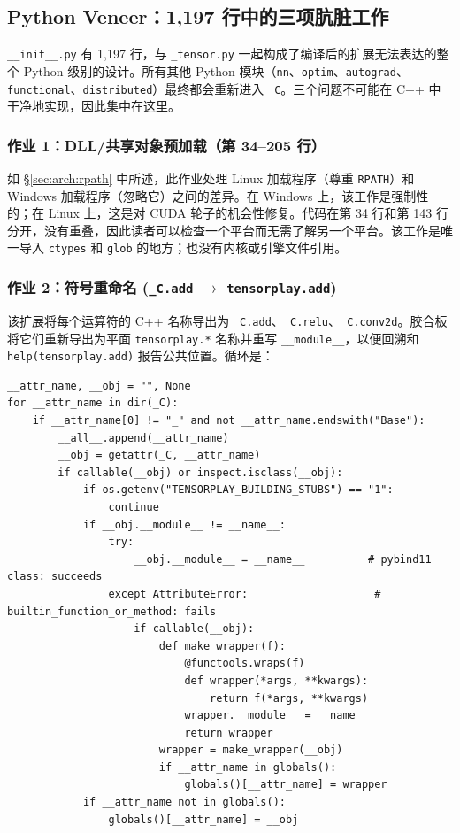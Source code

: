 \subsection{Python Veneer：1,197 行中的三项肮脏工作}
\label{sec:veneer}

\texttt{\_\_init\_\_.py} 有 1,197 行，与 \texttt{\_tensor.py} 一起构成了编译后的扩展无法表达的整个 Python 级别的设计。所有其他 Python 模块（\texttt{nn}、\texttt{optim}、\texttt{autograd}、\texttt{functional}、\texttt{distributed}）最终都会重新进入 \texttt{\_C}。三个问题不可能在 C++ 中干净地实现，因此集中在这里。

\subsubsection{作业 1：DLL/共享对象预加载（第 34--205 行）}
如 \S\ref{sec:arch:rpath} 中所述，此作业处理 Linux 加载程序（尊重 \texttt{RPATH}）和 Windows 加载程序（忽略它）之间的差异。在 Windows 上，该工作是强制性的；在 Linux 上，这是对 CUDA 轮子的机会性修复。代码在第 34 行和第 143 行分开，没有重叠，因此读者可以检查一个平台而无需了解另一个平台。该工作是唯一导入 \texttt{ctypes} 和 \texttt{glob} 的地方；也没有内核或引擎文件引用。

\subsubsection{作业 2：符号重命名 (\texttt{\_C.add} $\rightarrow$ \texttt{tensorplay.add})}

该扩展将每个运算符的 C++ 名称导出为 \texttt{\_C.add}、\texttt{\_C.relu}、\texttt{\_C.conv2d}。胶合板将它们重新导出为平面 \texttt{tensorplay.*} 名称并重写 \texttt{\_\_module\_\_}，以便回溯和 \texttt{help(tensorplay.add)} 报告公共位置。循环是：

\begin{lstlisting}[caption={renaming with builtin fallback.}, label=lst:renaming]
__attr_name, __obj = "", None
for __attr_name in dir(_C):
    if __attr_name[0] != "_" and not __attr_name.endswith("Base"):
        __all__.append(__attr_name)
        __obj = getattr(_C, __attr_name)
        if callable(__obj) or inspect.isclass(__obj):
            if os.getenv("TENSORPLAY_BUILDING_STUBS") == "1":
                continue
            if __obj.__module__ != __name__:
                try:
                    __obj.__module__ = __name__          # pybind11 class: succeeds
                except AttributeError:                    # builtin_function_or_method: fails
                    if callable(__obj):
                        def make_wrapper(f):
                            @functools.wraps(f)
                            def wrapper(*args, **kwargs):
                                return f(*args, **kwargs)
                            wrapper.__module__ = __name__
                            return wrapper
                        wrapper = make_wrapper(__obj)
                        if __attr_name in globals():
                            globals()[__attr_name] = wrapper
            if __attr_name not in globals():
                globals()[__attr_name] = __obj
\end{lstlisting}

